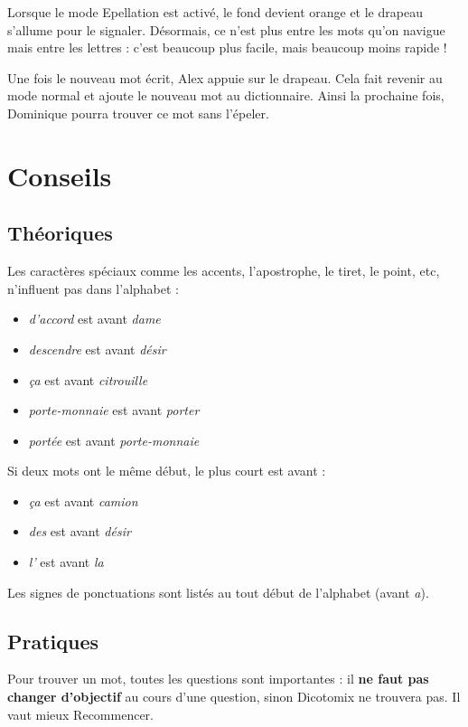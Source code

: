 \documentclass[french]{article}
\newcommand\image[2][.4]{\begin{center}\frame{\texttt{[image: images/\#2]}}\end{center}}
\begin{document}
Lorsque le mode Epellation est activé, le fond devient orange et le drapeau s'allume pour le signaler. Désormais, ce n'est plus entre les mots qu'on navigue mais entre les lettres : c'est beaucoup plus facile, mais beaucoup moins rapide !
\image{spell.png}

Une fois le nouveau mot écrit, Alex appuie sur le drapeau. Cela fait revenir au mode normal et ajoute le nouveau mot au dictionnaire. Ainsi la prochaine fois, Dominique pourra trouver ce mot sans l'épeler.

\section{Conseils}
\subsection{Théoriques}
Les caractères spéciaux comme les accents, l'apostrophe, le tiret, le point, etc, n'influent pas dans l'alphabet :
\begin{itemize}
	\item \emph{d'accord} est avant \emph{dame}
	\item \emph{descendre} est avant \emph{désir}
	\item \emph{ça} est avant \emph{citrouille}
	\item \emph{porte-monnaie} est avant \emph{porter}
	\item \emph{portée} est avant \emph{porte-monnaie}
\end{itemize}
\vspace{3mm}
Si deux mots ont le même début, le plus court est avant :
\begin{itemize}
	\item \emph{ça} est avant \emph{camion}
	\item \emph{des} est avant \emph{désir}
	\item \emph{l'} est avant \emph{la}
\end{itemize}
\vspace{3mm}
Les signes de ponctuations sont listés au tout début de l'alphabet (avant \emph{a}).

\subsection{Pratiques}
Pour trouver un mot, toutes les questions sont importantes : il \textbf{ne faut pas changer d'objectif} au cours d'une question, sinon Dicotomix ne trouvera pas. Il vaut mieux Recommencer.
\\
\end{document}
